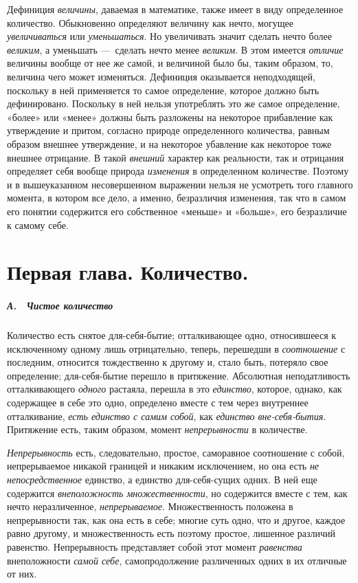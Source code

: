 Дефиниция {\em величины}, даваемая в математике, также
имеет в виду определенное количество. Обыкновенно определяют величину как
нечто, могущее {\em увеличиваться} или
{\em уменьшаться}. Но увеличивать значит сделать нечто
более {\em великим}, а уменьшать —~сделать нечто менее
{\em великим}. В этом имеется
{\em отличие} величины вообще от нее же самой, и
величиной было бы, таким образом, то, величина чего может изменяться.
Дефиниция оказывается неподходящей, поскольку в ней применяется то самое
определение, которое должно быть дефинировано. Поскольку в ней нельзя
употреблять это же самое определение, «более» или «менее» должны быть
разложены на некоторое прибавление как утверждение и притом, согласно
природе определенного количества, равным образом внешнее утверждение, и на
некоторое убавление как некоторое тоже внешнее отрицание. В такой
{\em внешний} характер как реальности, так и отрицания
определяет себя вообще природа {\em изменения} в
определенном количестве. Поэтому и в вышеуказанном несовершенном выражении
нельзя не усмотреть того главного момента, в котором все дело, а именно,
безразличия изменения, так что в самом его понятии содержится его
собственное «меньше» и «больше», его безразличие к самому себе.

\chapter*{Первая глава. Количество.}

\paragraph[А. \ Чистое количество]{А. \ Чистое количество}
Количество есть снятое для-себя-бытие; отталкивающее одно, относившееся к
исключенному одному лишь отрицательно, теперь, перешедши в
{\em соотношение} с последним, относится тождественно к
другому и, стало быть, потеряло свое определение; для-себя-бытие перешло в
притяжение. Абсолютная неподатливость отталкивающего
{\em одного} растаяла, перешла в это
{\em единство}, которое, однако, как содержащее в себе
это одно, определено вместе с тем через внутреннее отталкивание,
{\em есть единство с самим собой}, как
{\em единство вне-себя-бытия}. Притяжение есть, таким
образом, момент {\em непрерывности} в количестве.

{\em Непрерывность} есть, следовательно, простое,
саморавное соотношение с собой, непрерываемое никакой границей и никаким
исключением, но она есть {\em не непосредственное}
единство, а единство для-себя-сущих одних. В ней еще содержится
{\em внеположность множественности}, но содержится
вместе с тем, как нечто неразличенное,
{\em непрерываемое}. Множественность положена в
непрерывности так, как она есть в себе; многие суть одно, что и другое,
каждое равно другому, и множественность есть поэтому простое, лишенное
различий равенство. Непрерывность представляет собой этот момент
{\em равенства} внеположности
{\em самой себе}, самопродолжение различенных одних в
их отличные от них.

